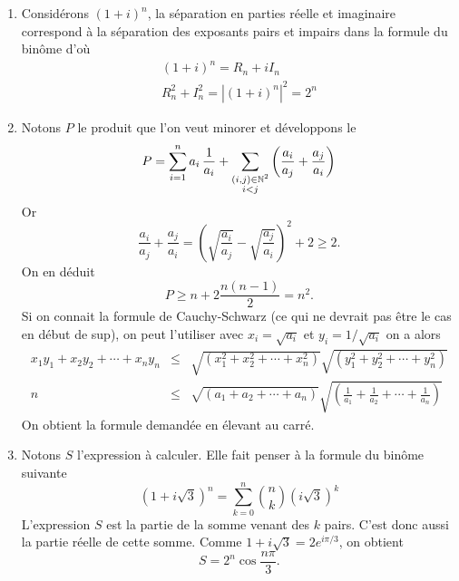 \begin{enumerate}
\item
Consid{\'e}rons $(1+i)^{n}$, la s{\'e}paration en parties r{\'e}elle
et imaginaire correspond {\`a} la s{\'e}paration des exposants pairs et impairs dans la formule du bin{\^o}me d'o{\`u}
\begin{eqnarray*}
(1+i)^{n}=R_{n}+iI_{n} \\
R_{n}^{2}+I_{n}^{2}=\left| (1+i)^{n}\right| ^{2}=2^{n}
\end{eqnarray*}

\item
Notons $P$ le produit que l'on veut minorer et développons le
\[
 P =\sum_{i=1}^{n}a_i\, \frac{1}{a_i} + \sum_{\substack{(i,j)\in \mathbb{N}^2 \\ i < j}}\left( \frac{a_i}{a_j} + \frac{a_j}{a_i}\right)  
\]
Or 
\[
 \frac{a_i}{a_j} + \frac{a_j}{a_i} = \left( \sqrt{\frac{a_i}{a_j}} - \sqrt{\frac{a_j}{a_i}}\right)^2 + 2 \geq 2.
\]
On en déduit
\[
 P \geq n + 2\frac{n(n-1)}{2} = n^2.
\]
Si on connait la formule de Cauchy-Schwarz (ce qui ne devrait pas être le cas en début de sup), on peut l'utiliser avec $x_{i}=\sqrt{a_{i}}$ et $y_{i}=1/\sqrt{a_{i}}$ on a alors
\begin{eqnarray*}
x_{1}y_{1}+x_{2}y_{2}+\cdots +x_{n}y_{n} &\leq& \sqrt{\left(
x_{1}^{2}+x_{2}^{2}+\cdots +x_{n}^{2}\right) }\sqrt{\left(
y_{1}^{2}+y_{2}^{2}+\cdots +y_{n}^{2}\right) } \\
n &\leq& \sqrt{\left( a_{1}+a_{2}+\cdots +a_{n}\right) }\sqrt{\left( \frac{1}{a_{1}}+\frac{1}{a_{2}}+\cdots +\frac{1}{a_{n}}\right) }
\end{eqnarray*}
On obtient la formule demand{\'e}e en {\'e}levant au carr{\'e}.

\item
Notons $S$ l'expression {\`a} calculer. Elle fait penser à la formule du bin{\^o}me suivante
\begin{displaymath}
 (1+i\sqrt{3})^{n}=\sum_{k=0}^n\binom{n}{k}(i\sqrt{3})^k
\end{displaymath}
L'expression $S$ est la partie de la somme venant des $k$ pairs. C'est donc aussi la partie r{\'e}elle de cette somme. Comme $1+i \sqrt{3}=2e^{i\pi /3}$, on obtient
\[ S=2^{n}\cos \frac{n\pi }{3}\mathrm{.} \]


\end{enumerate}
